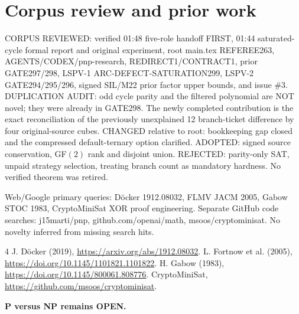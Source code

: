 \documentclass[11pt]{article}
\begin{document}
\section*{Corpus review and prior work}
CORPUS REVIEWED: verified 01:48 five-role handoff FIRST, 01:44 saturated-cycle formal report and original experiment, root main.tex REFEREE263, AGENTS/CODEX/pnp-research, REDIRECT1/CONTRACT1, prior GATE297/298, LSPV-1 ARC-DEFECT-SATURATION299, LSPV-2 GATE294/295/296, signed SIL/M22 prior factor upper bounds, and issue \#3. DUPLICATION AUDIT: odd cycle parity and the filtered polynomial are NOT novel; they were already in GATE298. The newly completed contribution is the exact reconciliation of the previously unexplained 12 branch-ticket difference by four original-source cubes. CHANGED relative to root: bookkeeping gap closed and the compressed default-ternary option clarified. ADOPTED: signed source conservation, GF$(2)$ rank and disjoint union. REJECTED: parity-only SAT, unpaid strategy selection, treating branch count as mandatory hardness. No verified theorem was retired.
\par\noindent Web/Google primary queries: D\"ocker 1912.08032, FLMV JACM 2005, Gabow STOC 1983, CryptoMiniSat XOR proof engineering. Separate GitHub code searches: j15marti/pnp, github.com/openai/math, msoos/cryptominisat. No novelty inferred from missing search hits.
\begin{thebibliography}{4}
 J. D\"ocker (2019), \url{https://arxiv.org/abs/1912.08032}.
 L. Fortnow et al. (2005), \url{https://doi.org/10.1145/1101821.1101822}.
 H. Gabow (1983), \url{https://doi.org/10.1145/800061.808776}.
 CryptoMiniSat, \url{https://github.com/msoos/cryptominisat}.
\end{thebibliography}
\noindent\textbf{P versus NP remains OPEN.}
\end{document}
